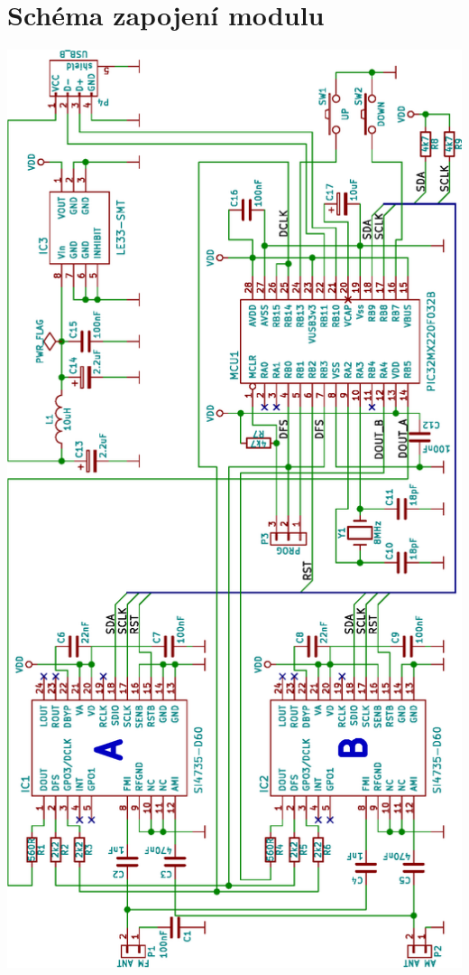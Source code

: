 \documentclass[czech,master,public,dept460,male,cpdeclaration]{diploma}	%
\begin{document}

\section{Schéma zapojení modulu}
\label{sec:ap-schema}


\begin{center}
 \includegraphics[scale=0.72]{figures/dfmt.eps}
\end{center}
 
\end{document}
